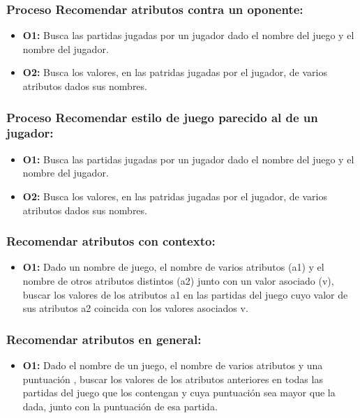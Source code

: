 \subsubsection{Proceso Recomendar atributos contra un oponente:}

\begin{itemize}
	\item \textbf{O1:} Busca las partidas jugadas por un jugador dado el nombre del juego y
		el nombre del jugador.\\
	\item \textbf{O2:} Busca los valores, en las patridas jugadas por el jugador,
		de varios atributos dados sus nombres.\\
\end{itemize}


\subsubsection{Proceso Recomendar estilo de juego parecido al de un jugador:}

\begin{itemize}
	\item \textbf{O1:} Busca las partidas jugadas por un jugador dado el nombre del juego y
		el nombre del jugador.\\
	\item \textbf{O2:} Busca los valores, en las patridas jugadas por el jugador,
		de varios atributos dados sus nombres.\\
\end{itemize}


\subsubsection{Recomendar atributos con contexto:}

\begin{itemize}
	\item \textbf{O1:} Dado un nombre de juego, el nombre de varios atributos (a1) y el nombre 
		de otros atributos distintos (a2) junto con un valor asociado (v), buscar los valores
		de los atributos a1 en las partidas del juego cuyo valor de sus atributos a2
		coincida con los valores asociados v.\\
\end{itemize}


\subsubsection{Recomendar atributos en general:}

\begin{itemize}
	\item \textbf{O1:} Dado el nombre de un juego, el nombre de varios atributos y una puntuación
		, buscar los valores de los atributos anteriores en todas las partidas del juego
		que los contengan y cuya puntuación sea mayor que la dada, junto con la puntuación
		de esa partida.\\
\end{itemize}
